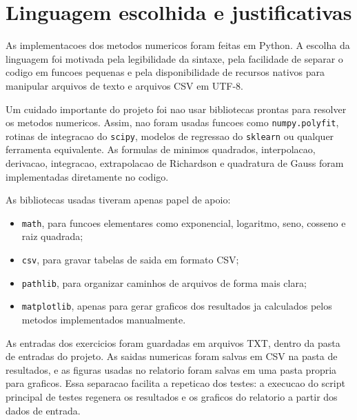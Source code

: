\documentclass[../main.tex]{subfiles}
\begin{document}
\section{Linguagem escolhida e justificativas}

As implementacoes dos metodos numericos foram feitas em Python. A escolha da
linguagem foi motivada pela legibilidade da sintaxe, pela facilidade de separar
o codigo em funcoes pequenas e pela disponibilidade de recursos nativos para
manipular arquivos de texto e arquivos CSV em UTF-8.

Um cuidado importante do projeto foi nao usar bibliotecas prontas para resolver
os metodos numericos. Assim, nao foram usadas funcoes como
\texttt{numpy.polyfit}, rotinas de integracao do \texttt{scipy}, modelos de
regressao do \texttt{sklearn} ou qualquer ferramenta equivalente. As formulas de
minimos quadrados, interpolacao, derivacao, integracao, extrapolacao de
Richardson e quadratura de Gauss foram implementadas diretamente no codigo.

As bibliotecas usadas tiveram apenas papel de apoio:

\begin{itemize}
    \item \texttt{math}, para funcoes elementares como exponencial, logaritmo,
    seno, cosseno e raiz quadrada;
    \item \texttt{csv}, para gravar tabelas de saida em formato CSV;
    \item \texttt{pathlib}, para organizar caminhos de arquivos de forma mais
    clara;
    \item \texttt{matplotlib}, apenas para gerar graficos dos resultados ja
    calculados pelos metodos implementados manualmente.
\end{itemize}

As entradas dos exercicios foram guardadas em arquivos TXT, dentro da pasta de
entradas do projeto. As saidas numericas foram salvas em CSV na pasta de
resultados, e as figuras usadas no relatorio foram salvas em uma pasta propria
para graficos. Essa separacao facilita a repeticao dos testes: a execucao do
script principal de testes regenera os resultados e os graficos do relatorio a
partir dos dados de entrada.
\end{document}
